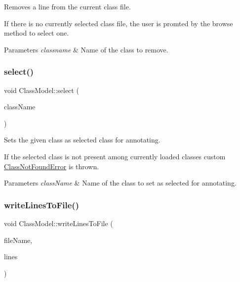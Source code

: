 Removes a line from the current class file. 

If there is no currently selected class file, the user is promted by the browse method to select one.


\begin{DoxyParams}{Parameters}
{\em classname} & Name of the class to remove. \\
\hline
\end{DoxyParams}
\mbox{\label{classClassModel_aa8c0739232fabe2dc589247155d4e49a}} 
\subsubsection{\texorpdfstring{select()}{select()}}
{\footnotesize\ttfamily void Class\+Model\+::select (\begin{DoxyParamCaption}\item[{const Q\+String \&}]{class\+Name }\end{DoxyParamCaption})}



Sets the given class as selected class for annotating. 

If the selected class is not present among currently loaded classes custom \hyperlink{classClassNotFoundError}{Class\+Not\+Found\+Error} is thrown.


\begin{DoxyParams}{Parameters}
{\em class\+Name} & Name of the class to set as selected for annotating. \\
\hline
\end{DoxyParams}
\mbox{\label{classClassModel_af443615d1dcb44d5345f1411e9822b25}} 
\subsubsection{\texorpdfstring{write\+Lines\+To\+File()}{writeLinesToFile()}}
{\footnotesize\ttfamily void Class\+Model\+::write\+Lines\+To\+File (\begin{DoxyParamCaption}\item[{const Q\+String \&}]{file\+Name,  }\item[{\hyperlink{classLinkedList}{Linked\+List}$<$ Q\+String $>$ \&}]{lines }\end{DoxyParamCaption})\hspace{0.3cm}{\ttfamily [private]}}



